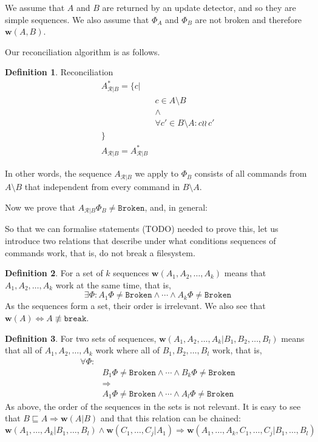 \documentclass[12pt]{article}
\newcommand{\fsbroken}{\mathtt{Broken}} %
\newcommand{\FS}{\Phi} %
\newcommand{\cbrk}{\mathtt{break}}
\newcommand{\eqext}{\sqsubseteq}
\newcommand{\nequiv}{\not\equiv}
\newcommand{\indep}{\wr\!\!\wr\,} %
\newcommand{\works}[1]{{\mathbf{w}}({#1})}
\newcommand{\worksc}[2]{{\mathbf{w}}({#1}|{#2})}
\newcommand{\ordered}[1]{#1}
\newcommand{\recchar}[3]{{#1}^{#3}_{\mathcal{R}|{#2}}}
\newcommand{\reca}{\recchar{A}{B}{}} %
\newcommand{\recaset}{\recchar{A}{B}{*}}
\theoremstyle{definition}
\newtheorem{mydef}{Definition}
\begin{document}
We assume that $A$ and $B$ are returned by an update detector,
and so they are simple sequences.
We also assume that $\FS_A$ and $\FS_B$ are not broken and therefore $\works{A,B}$.

Our reconciliation algorithm is as follows.

\begin{mydef}{Reconciliation}\label{def:reconciliation}
\begin{align*}
\recaset = \{c| & \\
& c\in A\setminus B \\
& \wedge \\
& \forall c'\in B\setminus A: c\indep c'\\
\} & \\
\reca = \ordered{\recaset}&
\end{align*}

In other words, the sequence $\reca$ we apply to $\FS_B$ consists of all commands from $A\setminus B$
that independent from every command in $B\setminus A$.
\end{mydef}

Now we prove that $\reca\FS_B\neq\fsbroken$, and, in general:









So that we can formalise statements (TODO) needed to prove this,
let us introduce two relations that describe under what conditions
sequences of commands work, that is, do not break a filesystem.

\begin{mydef}
For a set of $k$ sequences
$\works{A_1,A_2,\ldots,A_k}$ means that 
$A_1,A_2,\ldots,A_k$ work at the same time, that is,
\[\exists \FS: A_1\FS\neq\fsbroken \wedge \cdots \wedge A_k\FS\neq\fsbroken\]
As the sequences form a set, their order is irrelevant.
We also see that $\works{A} \Leftrightarrow A\nequiv \cbrk$. 
\end{mydef}

\begin{mydef}
For two sets of sequences, $\worksc{A_1,A_2,\ldots,A_k}{B_1,B_2,\ldots,B_l}$ means that 
all of $A_1,A_2,\ldots,A_k$ work where all of $B_1,B_2,\ldots,B_l$ work,
that is,
\begin{align*}
\forall \FS:&\\ 
&B_1\FS\neq\fsbroken \wedge \cdots \wedge B_k\FS\neq\fsbroken\\
&\Rightarrow\\
&A_1\FS\neq\fsbroken \wedge \cdots \wedge A_l\FS\neq\fsbroken
\end{align*}
As above, the order of the sequences in the sets is not relevant.
It is easy to see that 
$B\eqext A \Rightarrow \worksc{A}{B}$
and that this relation can be chained:
$ \worksc{A_1,\ldots,A_k}{B_1,\ldots,B_l} \wedge \worksc{C_1,\ldots,C_j}{A_1} \Rightarrow \worksc{A_1,\ldots,A_k,C_1,\ldots,C_j}{B_1,\ldots,B_l} $
\end{mydef}
\end{document}
